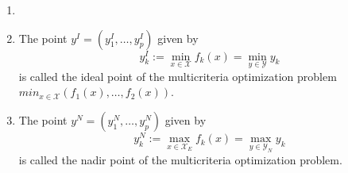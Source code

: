 \begin{definition}
    \begin{enumerate}
        \item[]
        \item The point $y^I = \left( y_1^I,\ldots,y_p^I \right)$ given by
            \begin{equation}
                y_k^I :=\mathop{\min}_{x \in \mathcal{X}} f_k(x) = \mathop{\min}_{y \in \mathcal{Y}} y_k
            \end{equation}
            is called the {\normalfont ideal point} of the multicriteria optimization problem $min_{x\in\mathcal{X}}\left(f_1(x),\ldots,f_2(x)\right)$.
        \item The point $y^N=\left(y_1^N,\ldots,y_p^N\right)$ given by 
            \begin{equation}
                y_k^N :=\mathop{\max}_{x \in \mathcal{X}_E} f_k(x) = \mathop{\max}_{y \in \mathcal{Y}_N} y_k
            \end{equation}
            is called the {\normalfont nadir point} of the multicriteria optimization problem.
    \end{enumerate}
\end{definition}

